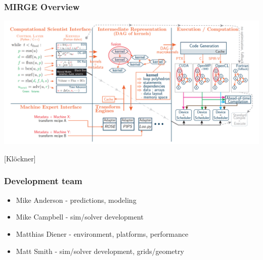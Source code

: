 
\begin{frame}\frametitle{MIRGE Overview}
\includegraphics[width=\textwidth]{figures/MIRGE.png}
\begin{center}
[Kl{\"o}ckner]
\end{center}
\end{frame}

\begin{frame}\frametitle{Development team}
\begin{multicols}{2}
\begin{itemize}
\item Mike Anderson - predictions, modeling
\item Mike Campbell - sim/solver development
\columnbreak
\item Matthias Diener - environment, platforms, performance
\item Matt Smith  - sim/solver development, grids/geometry
\end{itemize}
\end{multicols}
\end{frame}

